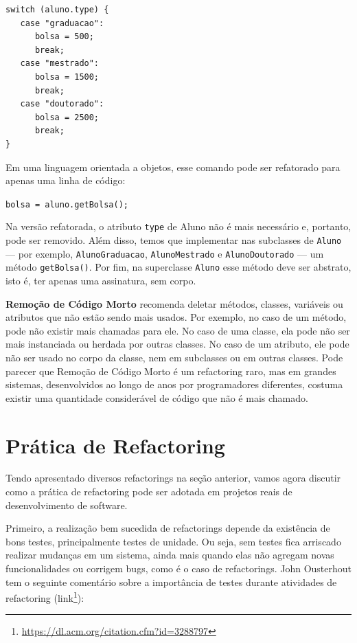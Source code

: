 \documentclass[
  11pt,
  twoside]{book}
\newcommand{\passthrough}[1]{#1}
\DeclareRobustCommand{\href}[2]{#2\footnote{\url{#1}}}
\begin{document}
\begin{lstlisting}
switch (aluno.type) {
   case "graduacao": 
      bolsa = 500;
      break;
   case "mestrado": 
      bolsa = 1500;
      break;
   case "doutorado": 
      bolsa = 2500;
      break;
}
\end{lstlisting}

Em uma linguagem orientada a objetos, esse comando pode ser refatorado
para apenas uma linha de código:

\passthrough{\lstinline!bolsa = aluno.getBolsa();!}

Na versão refatorada, o atributo \passthrough{\lstinline!type!} de Aluno
não é mais necessário e, portanto, pode ser removido. Além disso, temos
que implementar nas subclasses de \passthrough{\lstinline!Aluno!} ---
por exemplo, \passthrough{\lstinline!AlunoGraduacao!},
\passthrough{\lstinline!AlunoMestrado!} e
\passthrough{\lstinline!AlunoDoutorado!} --- um método
\passthrough{\lstinline!getBolsa()!}. Por fim, na superclasse
\passthrough{\lstinline!Aluno!} esse método deve ser abstrato, isto é,
ter apenas uma assinatura, sem corpo.

 \textbf{Remoção de Código
Morto} recomenda deletar métodos, classes, variáveis ou atributos que
não estão sendo mais usados. Por exemplo, no caso de um método, pode não
existir mais chamadas para ele. No caso de uma classe, ela pode não ser
mais instanciada ou herdada por outras classes. No caso de um atributo,
ele pode não ser usado no corpo da classe, nem em subclasses ou em
outras classes. Pode parecer que Remoção de Código Morto é um
refactoring raro, mas em grandes sistemas, desenvolvidos ao longo de
anos por programadores diferentes, costuma existir uma quantidade
considerável de código que não é mais chamado.

\hypertarget{pruxe1tica-de-refactoring}{%
\section{Prática de Refactoring}\label{pruxe1tica-de-refactoring}}

Tendo apresentado diversos refactorings na seção anterior, vamos agora
discutir como a prática de refactoring pode ser adotada em projetos
reais de desenvolvimento de software.

Primeiro, a realização bem sucedida de refactorings depende da
existência de bons testes, principalmente testes de unidade. Ou seja,
sem testes fica arriscado realizar mudanças em um sistema, ainda mais
quando elas não agregam novas funcionalidades ou corrigem bugs, como é o
caso de refactorings. John Ousterhout tem o seguinte comentário sobre a
importância de testes durante atividades de refactoring
(\href{https://dl.acm.org/citation.cfm?id=3288797}{link}):
\end{document}
